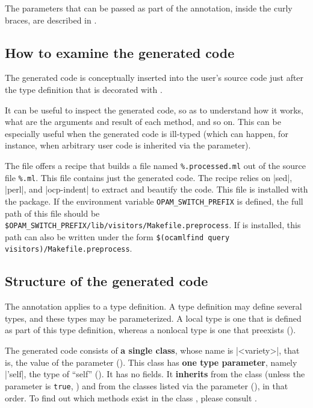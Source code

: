 \documentclass[11pt,a4paper,twoside]{article}
\renewcommand{\emph}[1]{\textbf{#1}}
\begin{document}
The parameters that can be passed as part of the \derivingvisitors annotation,
inside the curly braces, are described in .


\subsection{How to examine the generated code}

The generated code is conceptually inserted into the user's source code just
after the type definition that is decorated with \derivingvisitors.

It can be useful to inspect the generated code, so as to understand how it
works, what are the arguments and result of each method, and so on. This can
be especially useful when the generated code is ill-typed (which can happen,
for instance, when arbitrary user code is inherited via the \ancestors
parameter).

The file  offers a recipe that builds a file
named \verb|%.processed.ml| out of the source file \verb|%.ml|. This file
contains just the generated code. The recipe relies on \oc|sed|, \oc|perl|,
and \oc|ocp-indent| to extract and beautify the code. This file is installed
with the \visitors package. If the environment variable
\verb|OPAM_SWITCH_PREFIX| is defined, the full path of this file
should be \verb|$OPAM_SWITCH_PREFIX/lib/visitors/Makefile.preprocess|.
If \ocamlfind is installed, this path can also be written under the form
\verb|$(ocamlfind query visitors)/Makefile.preprocess|.


\subsection{Structure of the generated code}
\label{sec:structure}

The \derivingvisitors annotation applies to a type definition. A type
definition may define several types, and these types may be parameterized. A
local type is one that is defined as part of this type definition, whereas a
nonlocal type is one that preexists ().

The generated code consists of \emph{a single class}, whose name is \oc|<variety>|,
that is, the value of the \variety parameter (). This class
has \emph{one type parameter}, namely \oc|'self|, the type of ``self''
(). It has no fields. It \emph{inherits} from the class
 (unless the parameter \nude is \texttt{true}, )
and from the classes listed via the \ancestors parameter (),
in that order. To find out which methods exist in the class
, please consult .
\end{document}
